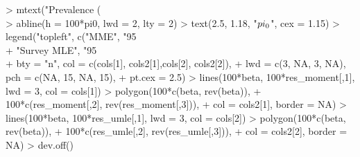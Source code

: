 \documentclass{article}
\begin{document}
\begin{Schunk}
\begin{Sinput}
> mtext("Prevalence (\\%)", side = 2, line = 3, cex = 1.15)
> abline(h = 100*pi0, lwd = 2, lty = 2)
> text(2.5, 1.18, "$\\pi_0$", cex = 1.15)
> legend("topleft", c("MME", "95\\% CI",
+                      "Survey MLE", "95\\% CI"),
+        bty = "n", col = c(cols[1], cols2[1],cols[2], cols2[2]),
+        lwd = c(3, NA, 3, NA), pch = c(NA, 15, NA, 15),
+        pt.cex = 2.5)
> lines(100*beta, 100*res_moment[,1], lwd = 3, col = cols[1])
> polygon(100*c(beta, rev(beta)),
+         100*c(res_moment[,2], rev(res_moment[,3])),
+         col = cols2[1], border = NA)
> lines(100*beta, 100*res_umle[,1], lwd = 3, col = cols[2])
> polygon(100*c(beta, rev(beta)),
+         100*c(res_umle[,2], rev(res_umle[,3])),
+         col = cols2[2], border = NA)
> dev.off()
\end{Sinput}
\end{Schunk}
\end{document}

